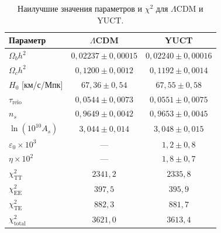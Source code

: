 \documentclass[11pt,a4paper]{article}
\begin{document}
	\begin{table}[H]
		\centering
		\caption{Наилучшие значения параметров и $\chi^2$ для $\Lambda$CDM и YUCT.}
		\label{tab:results}
		\LARGE
		\begin{tabular}{lcc}
			\toprule
			Параметр & $\Lambda$CDM & YUCT \\
			\midrule
			$\Omega_b h^2$ & $0,02237 \pm 0,00015$ & $0,02240 \pm 0,00016$ \\
			$\Omega_c h^2$ & $0,1200 \pm 0,0012$ & $0,1192 \pm 0,0014$ \\
			$H_0$ [км/с/Мпк] & $67,36 \pm 0,54$ & $67,55 \pm 0,58$ \\
			$\tau_{\mathrm{reio}}$ & $0,0544 \pm 0,0073$ & $0,0551 \pm 0,0075$ \\
			$n_s$ & $0,9649 \pm 0,0042$ & $0,9653 \pm 0,0045$ \\
			$\ln(10^{10}A_s)$ & $3,044 \pm 0,014$ & $3,048 \pm 0,015$ \\
			$\varepsilon_0 \times 10^3$ & — & $1,2 \pm 0,8$ \\
			$\eta \times 10^2$ & — & $1,8 \pm 0,7$ \\
			\midrule
			$\chi^2_{\mathrm{TT}}$ & $2341,2$ & $2335,8$ \\
			$\chi^2_{\mathrm{EE}}$ & $397,5$ & $395,9$ \\
			$\chi^2_{\mathrm{TE}}$ & $882,3$ & $881,7$ \\
			$\chi^2_{\mathrm{total}}$ & $3621,0$ & $3613,4$ \\
			\bottomrule
		\end{tabular}
	\end{table}
	
\end{document}
